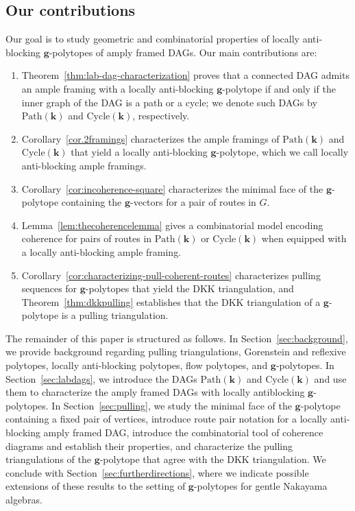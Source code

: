 \documentclass[12pt]{amsart}
\theoremstyle{definition}
\newcommand\bg{\mathbf{g}}
\newcommand\bk{\mathbf{k}}
\newcommand\Path{\mathrm{Path}}
\newcommand\Cycle{\mathrm{Cycle}}
\begin{document}
\subsection{Our contributions}

Our goal is to study geometric and combinatorial properties of locally anti-blocking $\bg$-polytopes of amply framed DAGs.
Our main contributions are:
\begin{enumerate}
    \item Theorem~\ref{thm:lab-dag-characterization} proves that a connected DAG admits an ample framing with a locally anti-blocking $\bg$-polytope if and only if the inner graph of the DAG is a path or a cycle; we denote such DAGs by $\Path(\bk)$ and $\Cycle(\bk)$, respectively.
    \item Corollary~\ref{cor.2framings} characterizes the ample framings of $\Path(\bk)$ and $\Cycle(\bk)$ that yield a locally anti-blocking $\bg$-polytope, which we call locally anti-blocking ample framings.
    \item Corollary~\ref{cor:incoherence-square} characterizes the minimal face of the $\bg$-polytope containing the $\bg$-vectors for a pair of routes in $G$.
    \item Lemma~\ref{lem:thecoherencelemma} gives a combinatorial model encoding coherence for pairs of routes in $\Path(\bk)$ or $\Cycle(\bk)$ when equipped with a locally anti-blocking ample framing.
    \item Corollary~\ref{cor:characterizing-pull-coherent-routes} characterizes pulling sequences for $\bg$-polytopes that yield the DKK triangulation, and Theorem~\ref{thm:dkkpulling} establishes that the DKK triangulation of a $\bg$-polytope is a pulling triangulation.
\end{enumerate}

The remainder of this paper is structured as follows.
In Section~\ref{sec:background}, we provide background regarding pulling triangulations, Gorenstein and reflexive polytopes, locally anti-blocking polytopes, flow polytopes, and $\bg$-polytopes.
In Section~\ref{sec:labdags}, we introduce the DAGs $\Path(\bk)$ and $\Cycle(\bk)$ and use them to characterize the amply framed DAGs with locally antiblocking $\bg$-polytopes.
In Section~\ref{sec:pulling}, we study the minimal face of the $\bg$-polytope containing a fixed pair of vertices, introduce route pair notation for a locally anti-blocking amply framed DAG, introduce the combinatorial tool of coherence diagrams and establish their properties, and characterize the pulling triangulations of the $\bg$-polytope that agree with the DKK triangulation.
We conclude with Section~\ref{sec:furtherdirections}, where we indicate possible extensions of these results to the setting of $\bg$-polytopes for gentle Nakayama algebras.
\end{document}
